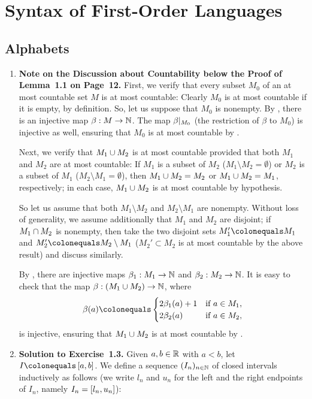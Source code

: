 \chapter{Syntax of First-Order Languages}
\section{Alphabets}
\begin{enumerate}[1.]
%
\item \textbf{Note on the Discussion about Countability below the Proof of Lemma~1.1 on Page~12.} First, we verify that every subset $M_0$ of an at most countable set $M$ is at most countable: Clearly $M_0$ is at most countable if it is empty, by definition. So, let us suppose that $M_0$ is nonempty. By , there is an injective map $\beta: M \to \mathbb{N}$. The map ${\beta|_{M_0}}$ (the restriction of $\beta$ to $M_0$) is injective as well, ensuring that $M_0$ is at most countable by .\par
Next, we verify that $M_1 \cup M_2$ is at most countable provided that both $M_1$ and $M_2$ are at most countable: If $M_1$ is a subset of $M_2$ ($M_1 \setminus M_2 = \emptyset$) or $M_2$ is a subset of $M_1$ ($M_2 \setminus M_1 = \emptyset$), then $M_1 \cup M_2 = M_2$ or $M_1 \cup M_2 = M_1$, respectively; in each case, $M_1 \cup M_2$ is at most countable by hypothesis.\par
So let us assume that both $M_1 \setminus M_2$ and $M_2 \setminus M_1$ are nonempty. Without loss of generality, we assume additionally that $M_1$ and $M_2$ are disjoint; if $M_1 \cap M_2$ is nonempty, then take the two disjoint sets $M_1' \colonequals M_1$ and $M_2' \colonequals M_2 \setminus M_1$ ($M_2' \subset M_2$ is at most countable by the above result) and discuss similarly.\par
By , there are injective maps $\beta_1: M_1 \to \mathbb{N}$ and $\beta_2: M_2 \to \mathbb{N}$. It is easy to check that the map $\beta: (M_1 \cup M_2) \to \mathbb{N}$, where
\[
\beta(a) \colonequals
\begin{cases}
2\beta_1(a) + 1 & \mbox{if \(a \in M_1\)}, \cr
2\beta_2(a)     & \mbox{if \(a \in M_2\)},
\end{cases}
\]
is injective, ensuring that $M_1 \cup M_2$ is at most countable by .
%
\item \textbf{Solution to Exercise~1.3.} Given $a, b \in \mathbb{R}$ with $a < b$, let $I \colonequals \clintv{a}{b}$. We define a sequence $(I_n)_{n \in \mathbb{N}}$ of closed intervals inductively as follows (we write $l_n$ and $u_n$ for the left and the right endpoints of $I_n$, namely $I_n = \left[l_n, u_n\right]$):

\end{enumerate}
